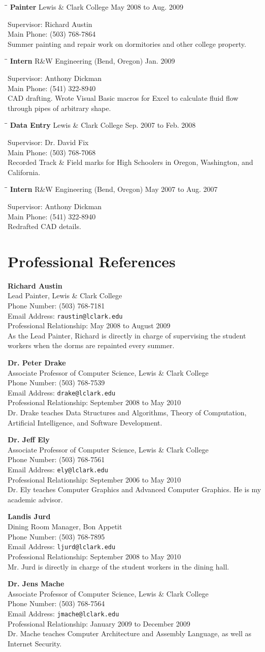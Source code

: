 \documentclass{res}
\newcommand{\employment}[6]{\vspace{-0.1in}\begin{tabbing}\hspace{2.3in}\= \hspace{2.6in}\= \kill
    \textbf{#1} \>#2     \>#3\\
                             \end{tabbing}\vspace{-20pt}
                             Supervisor: #4\\
                            Main Phone: #5\\
                             #6}
\newcommand{\reference}[6]{\textbf{#1}\\#2\\Phone Number: #3\\Email Address:
\texttt{#4}\\Professional Relationship: #5\\#6}
\begin{document}
\begin{resume}
    \employment{Painter}{Lewis \& Clark College}{May 2008 to Aug.
    2009}{Richard Austin}{(503) 768-7864}{Summer painting and repair work on
    dormitories and other college property.}

    \employment{Intern}{R\&W Engineering (Bend, Oregon)}{Jan. 2009}{Anthony
    Dickman}{(541) 322-8940}{CAD drafting.  Wrote Visual Basic macros for Excel to calculate
    fluid flow through pipes of arbitrary shape.}

    \employment{Data Entry}{Lewis \& Clark College}{Sep. 2007 to Feb.
    2008}{Dr. David Fix}{(503) 768-7068}{Recorded Track \& Field marks for High
    Schoolers in Oregon, Washington, and California.}

    \employment{Intern}{R\&W Engineering (Bend, Oregon)}{May 2007 to Aug. 2007}{Anthony
    Dickman}{(541) 322-8940}{Redrafted CAD details.}

\section{Professional References}
    \reference{Richard Austin}
    {Lead Painter, Lewis \& Clark College}
    {(503) 768-7181}
    {raustin@lclark.edu}
    {May 2008 to August 2009}
    {As the Lead Painter, Richard is directly in charge of supervising the
    student workers when the dorms are repainted every summer.}

    \reference{Dr. Peter Drake}
    {Associate Professor of Computer Science, Lewis \& Clark College}
    {(503) 768-7539}
    {drake@lclark.edu}
    {September 2008 to May 2010}
    {Dr. Drake teaches Data Structures and Algorithms, Theory of Computation,
    Artificial Intelligence, and Software Development.}
 
    \reference{Dr. Jeff Ely}
    {Associate Professor of Computer Science, Lewis \& Clark College}
    {(503) 768-7561}
    {ely@lclark.edu}
    {September 2006 to May 2010}
    {Dr. Ely teaches Computer Graphics and Advanced Computer Graphics.  He is my
    academic advisor.}

    \reference{Landis Jurd}
    {Dining Room Manager, Bon Appetit}
    {(503) 768-7895}
    {ljurd@lclark.edu}
    {September 2008 to May 2010}
    {Mr. Jurd is directly in charge of the student workers in the dining hall.}

	\reference{Dr. Jens Mache}
    {Associate Professor of Computer Science, Lewis \& Clark College}
    {(503) 768-7564}
    {jmache@lclark.edu}
    {January 2009 to December 2009}
    {Dr. Mache teaches Computer Architecture and Assembly Language, as well as
    Internet Security.}


\end{resume}
\end{document}
